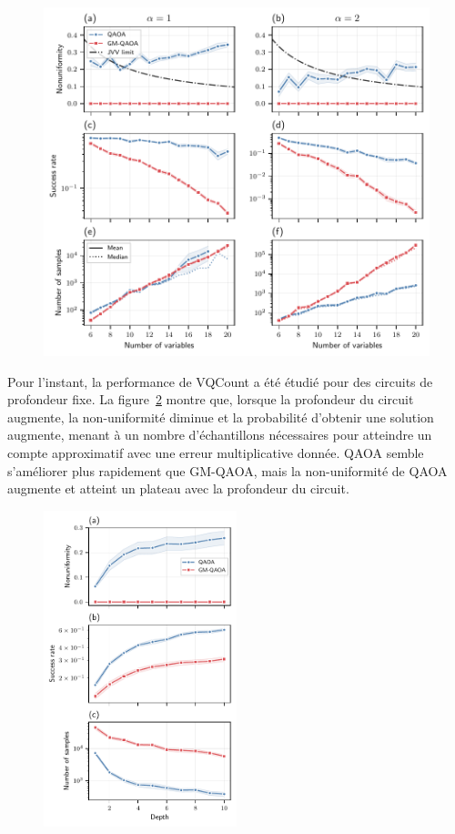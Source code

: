\begin{figure}[ht!]
    \centering
    \includegraphics[width=1\textwidth]{figures/nae3sat-number-of-samples.pdf}
    \caption{}
    \label{fig:nae3sat-number-of-samples}
\end{figure}

Pour l'instant, la performance de VQCount a été étudié pour des circuits de profondeur fixe. La figure~\ref{fig:nae3sat-depth} montre que, lorsque la profondeur du circuit augmente, la non-uniformité diminue et la probabilité d'obtenir une solution augmente, menant à un nombre d'échantillons nécessaires pour atteindre un compte approximatif avec une erreur multiplicative donnée. QAOA semble s'améliorer plus rapidement que GM-QAOA, mais la non-uniformité de QAOA augmente et atteint un plateau avec la profondeur du circuit.

\begin{figure}[ht!]
    \centering
    \includegraphics[width=0.5\textwidth]{figures/nae3sat-depth.pdf}
    \caption{}
    \label{fig:nae3sat-depth}
\end{figure}

